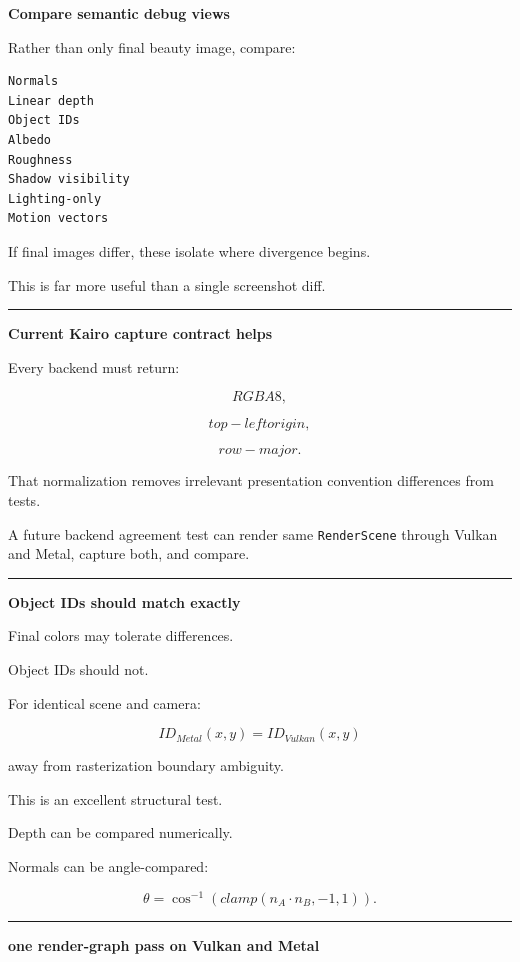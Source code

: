 \textbf{Compare semantic debug views}

Rather than only final beauty image, compare:

\begin{verbatim}
Normals
Linear depth
Object IDs
Albedo
Roughness
Shadow visibility
Lighting-only
Motion vectors
\end{verbatim}

If final images differ, these isolate where divergence begins.

This is far more useful than a single screenshot diff.

\begin{center}\rule{0.5\linewidth}{0.5pt}\end{center}

\textbf{Current Kairo capture contract helps}

Every backend must return:

\[
RGBA8,
\]

\[
top-left origin,
\]

\[
row-major.
\]

That normalization removes irrelevant presentation convention differences from tests.

A future backend agreement test can render same \texttt{RenderScene} through Vulkan and Metal, capture both, and compare.

\begin{center}\rule{0.5\linewidth}{0.5pt}\end{center}

\textbf{Object IDs should match exactly}

Final colors may tolerate differences.

Object IDs should not.

For identical scene and camera:

\[
ID_{Metal}(x,y)
=
ID_{Vulkan}(x,y)
\]

away from rasterization boundary ambiguity.

This is an excellent structural test.

Depth can be compared numerically.

Normals can be angle-compared:

\[
\theta=
\cos^{-1}
(
clamp(
n_A\cdot n_B,
-1,1
)).
\]

\begin{center}\rule{0.5\linewidth}{0.5pt}\end{center}

\textbf{one render-graph pass on Vulkan and Metal}

